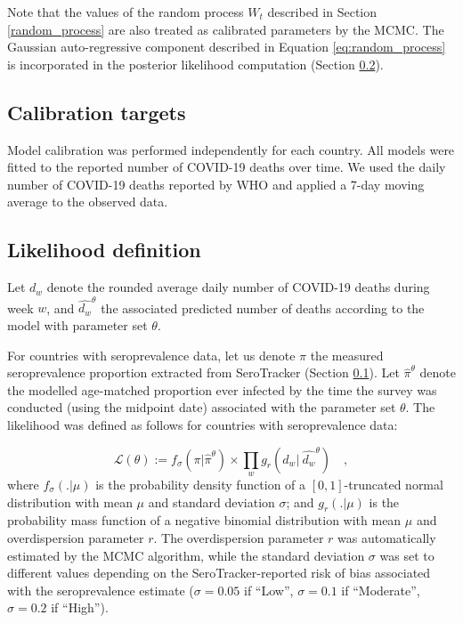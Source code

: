 Note that the values of the random process $W_t$ described in Section \ref{random_process} are also treated as calibrated parameters by the MCMC. The Gaussian 
auto-regressive component described in Equation \ref{eq:random_process} is incorporated in the posterior likelihood 
computation (Section \ref{likelihood}).

\subsection{Calibration targets}
\label{targets}
Model calibration was performed independently for each country. All models were fitted to the reported number of COVID-19 deaths over time.
We used the daily number of COVID-19 deaths reported by WHO and applied a 7-day moving average to the observed data. 



\subsection{Likelihood definition}
\label{likelihood}
Let $d_w$ denote the rounded average daily number of COVID-19 deaths during week $w$, and $\hat{d_w}^\theta$ 
the associated predicted number of deaths according to the model with parameter set $\theta$. 

For countries with seroprevalence data, let us denote $\pi$ the measured seroprevalence proportion extracted from SeroTracker (Section \ref{targets}). 
Let $\hat{\pi}^\theta$ denote the modelled age-matched proportion ever infected by the time the survey was conducted (using the midpoint date) 
associated with the parameter set $\theta$. 
The likelihood was defined as follows for countries with seroprevalence data:

\begin{equation}
    \label{eq:likelihood}
    \mathcal{L}(\theta) := f_{\sigma}(\pi | \hat{\pi}^\theta) \times \prod_w g_r(d_w | \:\hat{d_w}^\theta) \quad ,
\end{equation}
where $f_{\sigma}( . | \mu )$ is the probability density function of a $[0, 1]$-truncated normal distribution with mean $\mu$ and standard deviation $\sigma$; and 
$g_r(. | \mu)$ is the probability mass function of a negative binomial distribution with mean $\mu$ and 
overdispersion parameter $r$. The overdispersion parameter $r$ was automatically estimated by the MCMC algorithm, while the standard deviation $\sigma$ was set to different 
values depending on the SeroTracker-reported risk of bias associated with the seroprevalence estimate ($\sigma=0.05$ if ``Low'', $\sigma=0.1$ if ``Moderate'', $\sigma=0.2$ if ``High''). 

